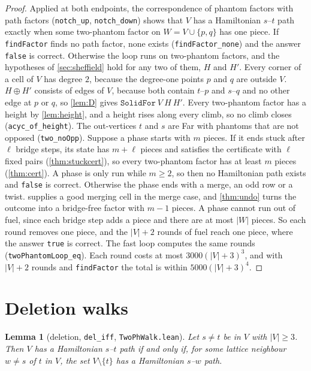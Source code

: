 \documentclass[11pt]{article}
\theoremstyle{plain}
\newtheorem{lemma}[theorem]{Lemma}
\theoremstyle{definition}
\theoremstyle{remark}
\newcommand{\lean}[1]{\texttt{#1}}
\begin{document}
\begin{proof}
Applied at both endpoints, the correspondence of phantom factors with path factors
(\lean{notch\_up}, \lean{notch\_down}) shows that $V$ has a Hamiltonian $s$--$t$ path exactly when
some two-phantom factor on $W=V\cup\{p,q\}$ has one piece.
If \lean{findFactor} finds no path factor, none exists (\lean{findFactor\_none}) and the answer
\lean{false} is correct.
Otherwise the loop runs on two-phantom factors, and the hypotheses of \cref{sec:sheffield} hold for
any two of them, $H$ and $H'$.
Every corner of a cell of $V$ has degree $2$, because the degree-one points $p$ and $q$ are outside
$V$.
$H\oplus H'$ consists of edges of $V$, because both contain $t$--$p$ and $s$--$q$ and no other edge
at $p$ or $q$, so \cref{lem:D} gives $\lean{SolidFor}\ V\ H\ H'$.
Every two-phantom factor has a height by \cref{lem:height}, and a height rises along every climb,
so no climb closes (\lean{acyc\_of\_height}).
The out-vertices $t$ and $s$ are Far with phantoms that are not opposed (\lean{two\_noOpp}).
Suppose a phase starts with $m$ pieces.
If it ends stuck after $\ell$ bridge steps, its state has $m+\ell$ pieces and satisfies the
certificate with $\ell$ fixed pairs (\cref{thm:stuckcert}), so every two-phantom factor has at least $m$ pieces
(\cref{thm:cert}).
A phase is only run while $m\ge2$, so then no Hamiltonian path exists and \lean{false} is correct.
Otherwise the phase ends with a merge, an odd row or a twist.
 supplies a good merging cell in the merge case, and \cref{thm:undo} turns the outcome
into a bridge-free factor with $m-1$ pieces.
A phase cannot run out of fuel, since each bridge step adds a piece and there are at most $|W|$
pieces.
So each round removes one piece, and the $|V|+2$ rounds of fuel reach one piece, where the answer
\lean{true} is correct.
The fast loop computes the same rounds (\lean{twoPhantomLoop\_eq}).
Each round costs at most $3000(|V|+3)^3$, and with $|V|+2$ rounds and \lean{findFactor} the total is
within $5000(|V|+3)^4$.
\end{proof}

\section{Deletion walks}
\label{sec:walk}

\begin{lemma}[deletion, \lean{del\_iff}, \lean{TwoPhWalk.lean}]
\label{lem:del}
Let $s\ne t$ be in $V$ with $|V|\ge3$.
Then $V$ has a Hamiltonian $s$--$t$ path if and only if, for some lattice neighbour $w\ne s$ of
$t$ in $V$, the set $V\setminus\{t\}$ has a Hamiltonian $s$--$w$ path.
\end{lemma}
\end{document}
